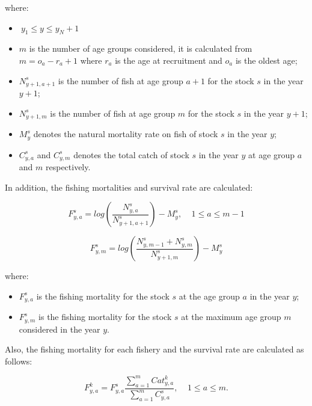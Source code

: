 \documentclass{article}
\begin{document}
where:
\begin{itemize}
    \item $\ y_1\leq y \leq y_N+1$
    \item $m$ is the number of age groups considered, it is calculated from $m=o_a-r_a+1$ where $r_a$ is the age at recruitment and $o_a$ is the oldest age;
    
    \item $N^{s}_{y+1,a+1}$ is the number of fish at age group $a+1$ for the stock $s$ in the year $y+1$;

    \item $N^{s}_{y+1,m}$ is the number of fish at age group $m$ for the stock $s$ in the year $y+1$;

    \item $M^{s}_{y}$ denotes the natural mortality rate on fish of stock $s$ in the year $y$;

    \item $C^s_{y,a}$ and $C^s_{y,m}$ denotes the total catch of stock $s$ in the year $y$ at age group $a$ and $m$ respectively.
    
\end{itemize}

\hfill

In addition, the fishing mortalities and survival rate are calculated:

\begin{equation}
F^s_{y,a}=log\left(\dfrac{N^s_{y,a}}{N^s_{y+1,a+1}}\right)-M^s_y, \ \ \ \ \ 1\leq a \leq m-1
\end{equation}

\begin{equation}
F^s_{y,m}=log\left(\dfrac{N^s_{y,m-1}+N^s_{y,m}}{N^s_{y+1,m}}\right)-M^s_y
\end{equation}

where:

\begin{itemize}
    \item $F^s_{y,a}$ is the fishing mortality for the stock $s$ at the age group $a$ in the year $y$;

    \item $F^s_{y,m}$ is the fishing mortality for the stock $s$ at the maximum age group $m$ considered in the year $y$.
\end{itemize}

\hfill

Also, the fishing mortality for each fishery and the survival rate are calculated as follows:

\begin{equation}
F^k_{y,a}=F^s_{y,a} \dfrac{\sum_{a = 1} ^{m} Cat^k_{y,a}}{\sum_{a=1} ^{m} C^s_{y,a}}, \ \ \ \ \ 1\leq a \leq m.
\end{equation}
\end{document}
